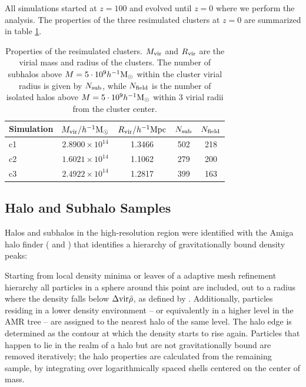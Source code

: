 \documentclass[useAMS,usenatbib]{mn2e}
\begin{document}
All simulations started at $z=100$ and evolved until $z=0$ where we perform
the analysis. The properties of the three resimulated clusters at $z=0$ are
summarized in table \ref{tab:clusterprop}.
%
\begin{table}
  \begin{center} \begin{tabular}{lcccc} \hline Simulation &
      $M_{\rm vir} / h^{-1}{\rm M}_\odot $ & $R_{\rm vir} /
      h^{-1}{\rm Mpc}$ & $N_{\rm sub}$ & $N_{\rm field}$ \\ \hline
      c1 & $2.8900\times10^{14}$ & 1.3466 & 502 & 218 \\ c2 &
      $1.6021\times10^{14}$ & 1.1062 & 279 & 200 \\ c3 &
      $2.4922\times10^{14}$ & 1.2817 & 399 & 163 \\ \hline
    \end{tabular} \end{center}
  \caption{\label{tab:clusterprop}Properties of the resimulated
    clusters. $M_{\rm vir}$ and $R_{\rm vir}$ are the virial mass and radius
    of the clusters. The number of subhalos above $M=5\cdot10^9h^{-1}{\rm
      M}_\odot$ within the cluster virial radius is given by $N_{\rm sub}$,
    while $N_{\rm field}$ is the number of isolated halos above
    $M=5\cdot10^9h^{-1}{\rm M}_\odot$ within $3$ virial radii from the cluster
    center.}
\end{table}
%
\subsection{Halo and Subhalo Samples}
%
Halos and subhalos in the high-resolution region were identified with the {\sc
  Amiga} halo finder (\cite{Knollmann2009} and \cite{Gill2004a}) that
identifies a hierarchy of gravitationally bound density peaks:

Starting from local density minima or leaves of a adaptive mesh refinement
hierarchy all particles in a sphere around this point are included, out to a
radius where the density falls below $\Delta{\rm vir}\bar{\rho}$, as defined
by \cite{Bryan1998}. Additionally, particles residing in a lower density
environment -- or equivalently in a higher level in the AMR tree -- are
assigned to the nearest halo of the same level. The halo edge is determined as
the contour at which the density starts to rise again. Particles that happen
to lie in the realm of a halo but are not gravitationally bound are removed
iteratively; the halo properties are calculated from the remaining sample, by
integrating over logarithmically spaced shells centered on the center of mass.
\end{document}
